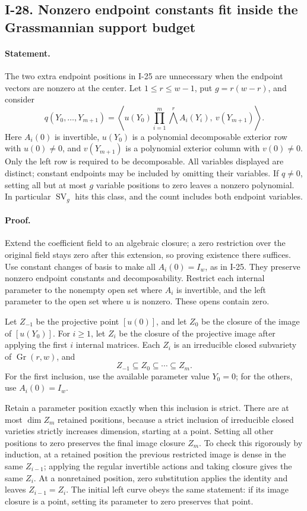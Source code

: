 \subsection{I-28. Nonzero endpoint constants fit inside the Grassmannian support budget}
\label{I-28}

\paragraph{Statement.}
The two extra endpoint positions in I-25 are unnecessary when
the endpoint vectors are nonzero at the center.  Let
$1\le r\le w-1$, put $g=r(w-r)$, and consider
\[
 q(Y_0,\ldots,Y_{m+1})
 =\left\langle u(Y_0)
       \prod_{i=1}^m\bigwedge^r A_i(Y_i),\ v(Y_{m+1})\right\rangle.
 \tag{I.39}
\]
Here $A_i(0)$ is invertible, $u(Y_0)$ is a polynomial
decomposable exterior row with $u(0)\ne0$, and $v(Y_{m+1})$
is a polynomial exterior column with $v(0)\ne0$.
Only the left row is required to be decomposable.
All variables displayed are distinct; constant endpoints may
be included by omitting their variables.
If $q\ne0$, setting all but at most $g$ variable positions
to zero leaves a nonzero polynomial.  In particular
$\operatorname{SV}_{g}$ hits this class, and the count includes
both endpoint variables.

\paragraph{Proof.}
Extend the coefficient field to an algebraic closure; a zero
restriction over the original field stays zero after this
extension, so proving existence there suffices.  Use constant
changes of basis to make all $A_i(0)=I_w$, as in I-25.
They preserve nonzero endpoint constants and decomposability.
Restrict each internal parameter to the nonempty open set
where $A_i$ is invertible, and the left parameter to the open
set where $u$ is nonzero.  These opens contain zero.

Let $Z_{-1}$ be the projective point $[u(0)]$, and let $Z_0$
be the closure of the image of $[u(Y_0)]$.  For $i\ge1$,
let $Z_i$ be the closure of the projective image after applying
the first $i$ internal matrices.  Each $Z_i$ is an irreducible
closed subvariety of $\operatorname{Gr}(r,w)$, and
\[
 Z_{-1}\subseteq Z_0\subseteq\cdots\subseteq Z_m.
\]
For the first inclusion, use the available parameter value
$Y_0=0$; for the others, use $A_i(0)=I_w$.

Retain a parameter position exactly when this inclusion is
strict.  There are at most $\dim Z_m$ retained positions,
because a strict inclusion of irreducible closed varieties
strictly increases dimension, starting at a point.
Setting all other positions to zero preserves the final
image closure $Z_m$.  To check this rigorously by induction,
at a retained position the previous restricted image is
dense in the same $Z_{i-1}$; applying the regular invertible
actions and taking closure gives the same $Z_i$.  At a
nonretained position, zero substitution applies the identity
and leaves $Z_{i-1}=Z_i$.  The initial left curve obeys the
same statement: if its image closure is a point, setting its
parameter to zero preserves that point.

